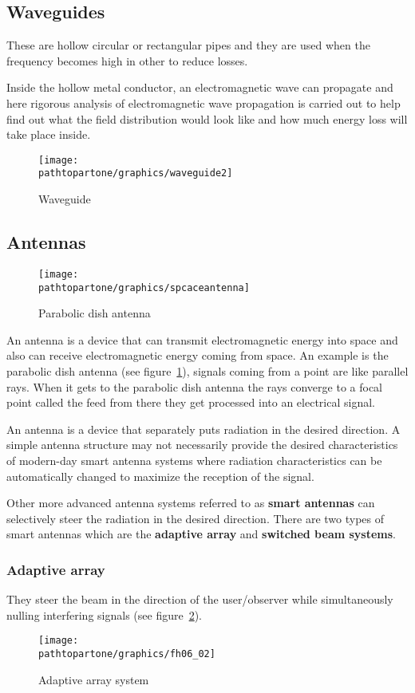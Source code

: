 \subsection{Waveguides}
These are hollow circular or rectangular pipes and they are used when the frequency becomes high in other to reduce losses. 

Inside the hollow metal conductor, an electromagnetic wave can propagate and here rigorous analysis of electromagnetic wave propagation is carried out to help find out what the field distribution would look like and how much energy loss will take place inside.
\begin{figure}[h]
\centering
\texttt{[image: \\pathtopartone/graphics/waveguide2]}
\caption{Waveguide}
\end{figure}

\subsection{Antennas}
\begin{figure}[h]
\centering
\texttt{[image: \\pathtopartone/graphics/spcaceantenna]}
\caption{Parabolic dish antenna}
\label{fig:spaceantenna}
\end{figure}

An antenna is a device that can transmit electromagnetic energy into space and also can receive electromagnetic energy coming from space. An example is the parabolic dish antenna (see figure~\ref{fig:spaceantenna}), signals coming from a point are like parallel rays. When it gets to the parabolic dish antenna the rays converge to a focal point called the feed from there they get processed into an electrical signal.

An antenna is a device that separately puts radiation in the desired direction. A simple antenna structure may not necessarily provide the desired characteristics of modern-day smart antenna systems where radiation characteristics can be automatically changed to maximize the reception of the signal.

Other more advanced antenna systems referred to as \textbf{smart antennas} can selectively steer the radiation in the desired direction. There are two types of smart antennas which are the \textbf{adaptive array} and \textbf{switched beam systems}.

\subsubsection{Adaptive array}
They steer the beam in the direction of the user/observer while simultaneously nulling interfering signals (see figure~\ref{fig:fh06_02}).
\begin{figure}[h]
\centering
\texttt{[image: \\pathtopartone/graphics/fh06\_02]}
\caption{Adaptive array system}
\label{fig:fh06_02}
\end{figure}

